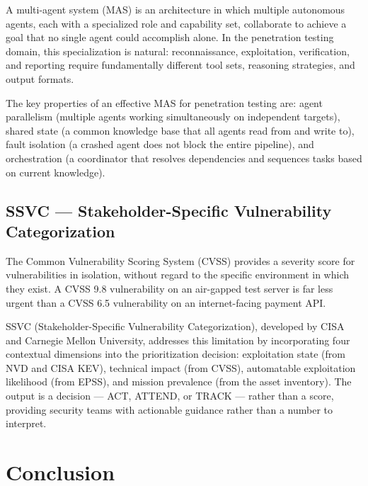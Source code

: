 \documentclass[12pt,a4paper]{report}
\begin{document}
A multi-agent system (MAS) is an architecture in which multiple autonomous agents,
each with a specialized role and capability set, collaborate to achieve a goal that
no single agent could accomplish alone. In the penetration testing domain, this
specialization is natural: reconnaissance, exploitation, verification, and reporting
require fundamentally different tool sets, reasoning strategies, and output formats.

The key properties of an effective MAS for penetration testing are: agent
parallelism (multiple agents working simultaneously on independent targets),
shared state (a common knowledge base that all agents read from and write to),
fault isolation (a crashed agent does not block the entire pipeline), and
orchestration (a coordinator that resolves dependencies and sequences tasks
based on current knowledge).

\subsection{SSVC --- Stakeholder-Specific Vulnerability Categorization}

The Common Vulnerability Scoring System (CVSS) provides a severity score for
vulnerabilities in isolation, without regard to the specific environment in which
they exist. A CVSS 9.8 vulnerability on an air-gapped test server is far less
urgent than a CVSS 6.5 vulnerability on an internet-facing payment API.

SSVC (Stakeholder-Specific Vulnerability Categorization), developed by CISA and
Carnegie Mellon University, addresses this limitation by incorporating four
contextual dimensions into the prioritization decision: exploitation state (from
NVD and CISA KEV), technical impact (from CVSS), automatable exploitation
likelihood (from EPSS), and mission prevalence (from the asset inventory). The
output is a decision --- ACT, ATTEND, or TRACK --- rather than a score, providing
security teams with actionable guidance rather than a number to interpret.

\section*{Conclusion}
\end{document}
